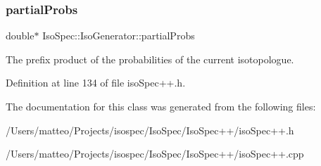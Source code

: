 \subsubsection{\texorpdfstring{partial\+Probs}{partialProbs}}
{\footnotesize\ttfamily double$\ast$ Iso\+Spec\+::\+Iso\+Generator\+::partial\+Probs\hspace{0.3cm}{\ttfamily [protected]}}

The prefix product of the probabilities of the current isotopologue. 

Definition at line 134 of file iso\+Spec++.\+h.



The documentation for this class was generated from the following files\+:\begin{DoxyCompactItemize}
\item 
/\+Users/matteo/\+Projects/isospec/\+Iso\+Spec/\+Iso\+Spec++/iso\+Spec++.\+h\item 
/\+Users/matteo/\+Projects/isospec/\+Iso\+Spec/\+Iso\+Spec++/iso\+Spec++.\+cpp\end{DoxyCompactItemize}

